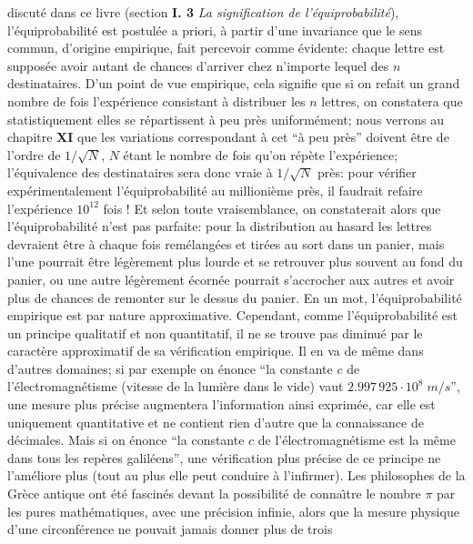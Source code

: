 discut\'e dans ce livre (section {\bf I. 3} {\it La signification de
l'\'equiprobabilit\'e}),  l'\'equiprobabilit\'e est postul\'ee a priori, 
\`a
partir d'une invariance que le sens commun,  d'origine empirique, fait
percevoir comme \'evidente:  chaque lettre est
suppos\'ee avoir autant de chances d'arriver chez n'importe lequel des 
$n$ destinataires.  D'un point de vue empirique,  cela signifie que si on
refait un grand nombre de fois l'exp\'erience consistant \`a distribuer les
$n$ lettres,  on constatera que statistiquement elles se r\'epartissent 
\`a peu pr\`es uniform\'ement;  nous verrons au chapitre {\bf  XI} que 
les variations correspondant \`a cet ``\`a peu pr\`es'' doivent \^etre de
l'ordre de $1/\sqrt{N}$, $N$ \'etant le nombre de fois qu'on r\'ep\`ete 
l'exp\'erience;  l'\'equivalence des destinataires sera donc 
vraie \`a $1/\sqrt{N}$ pr\`es:  pour v\'erifier exp\'erimentalement
l'\'equiprobabilit\'e au millioni\`eme pr\`es,  il faudrait refaire
l'exp\'erience $10^{12}$ fois !  Et selon toute vraisemblance,  on
constaterait alors que l'\'equiprobabilit\'e n'est pas parfaite:  pour la
distribution au hasard les lettres devraient \^etre \`a chaque fois 
rem\'elang\'ees et tir\'ees au sort dans un panier,  mais l'une pourrait 
\^etre l\'eg\`erement plus lourde et se retrouver plus souvent au fond du 
panier,  ou une autre l\'eg\`erement \'ecorn\'ee pourrait s'accrocher aux 
autres et avoir plus de chances de remonter sur le dessus du panier.  En 
un mot,  l'\'equiprobabilit\'e empirique est par nature approximative. 
Cependant,  comme l'\'equiprobabilit\'e est un principe qualitatif et non
quantitatif,  il ne se trouve pas diminu\'e par le caract\`ere approximatif
de sa v\'erification empirique.  Il en va de m\^eme dans d'autres domaines;
si par exemple on \'enonce ``la constante $c$ de l'\'electromagn\'etisme
(vitesse de la lumi\`ere dans  le vide) vaut $2.997\, 925 \cdot 10^{8}\;
m/s$'',  une mesure plus pr\'ecise augmentera l'information ainsi
exprim\'ee,  car elle est uniquement quantitative et ne contient rien
d'autre que la connaissance de d\'ecimales.  Mais si on \'enonce ``la 
constante $c$ de l'\'electromagn\'etisme est la m\^eme dans tous les
rep\`eres galil\'eens'',  une v\'erification plus pr\'ecise de ce principe 
ne l'am\'eliore plus (tout au plus elle peut conduire \`a l'infirmer).  
\medskip
Les philosophes de la Gr\`ece antique ont \'et\'e fascin\'es devant la
possibilit\'e de conna{\^\i}tre le nombre $\pi$ par les pures 
math\'ematiques,  avec une pr\'ecision infinie,  alors que la mesure 
physique d'une circonf\'erence ne pouvait jamais donner plus de trois
